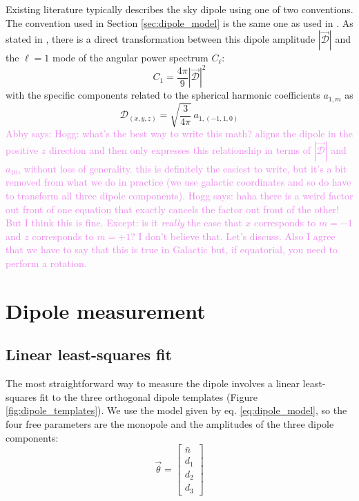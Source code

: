 \documentclass[modern]{aastex631}
\newcommand{\abby}[1]{\textcolor{violet}{Abby says: #1}}
\newcommand{\hogg}[1]{\textcolor{hoggpink}{Hogg says: #1}}
\begin{document}
Existing literature typically describes the sky dipole using one of two conventions.
The convention used in Section \ref{sec:dipole_model} is the same one as used in \citet{secrest_test_2021}.
As stated in \citet{gibelyou_dipoles_2012}, there is a direct transformation between this dipole amplitude $|\vec{\mathcal{D}}|$ and the $\ell=1$ mode of the angular power spectrum $C_\ell$:
\begin{equation}
    C_1 = \frac{4\pi}{9}|\vec{\mathcal{D}}|^2
\end{equation}
with the specific components related to the spherical harmonic coefficients $a_{1,m}$ as
\begin{equation}
    \mathcal{D}_{(x,y,z)} = \sqrt{\frac{3}{4\pi}}\,a_{1,(-1, 1, 0)}
\end{equation}
\abby{Hogg: what's the best way to write this math? \citet{gibelyou_dipoles_2012} aligns the dipole in the positive $z$ direction and then only expresses this relationship in terms of $|\vec{\mathcal{D}}|$ and $a_{10}$, without loss of generality. this is definitely the easiest to write, but it's a bit removed from what we do in practice (we use galactic coordinates and so do have to transform all three dipole components). \hogg{haha there is a weird factor out front of one equation that exactly cancels the factor out front of the other! But I think this is fine. Except: is it \emph{really} the case that $x$ corresponds to $m=-1$ and $z$ corresponds to $m=+1$? I don't believe that. Let's discuss. Also I agree that we have to say that this is true in Galactic but, if equatorial, you need to perform a rotation.}}


\section{Dipole measurement}
\label{sec:dipole_measurement}

\subsection{Linear least-squares fit}
\label{sec:standard_fit}

The most straightforward way to measure the dipole involves a linear least-squares fit to the three orthogonal dipole templates (Figure \ref{fig:dipole_templates}).
We use the model given by eq. \ref{eq:dipole_model}, so the four free parameters are the monopole and the amplitudes of the three dipole components:
\begin{equation}
    \vec{\theta} = \begin{bmatrix}
           \bar n \\
           d_1 \\
           d_2 \\
           d_3
         \end{bmatrix}
\end{equation}
\end{document}
